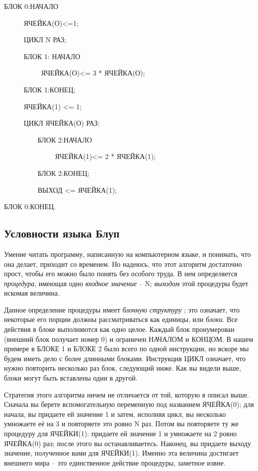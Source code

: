 \documentclass[../main.tex]{subfiles}
\begin{document}
БЛОК 0:НАЧАЛО

~~~~~ ЯЧЕЙКА(О)\textless=1;

~~~~~ ЦИКЛ N РАЗ;

~~~~~ БЛОК 1: НАЧАЛО

~~~~~~~~~~ ЯЧЕЙКА(О)\textless= 3 * ЯЧЕЙКА(О);

~~~~~ БЛОК 1:КОНЕЦ;

~~~~~ ЯЧЕЙКА(1) \textless= 1;

~~~~~ ЦИКЛ ЯЧЕЙКА(О) РАЗ:

~~~~~~~~~ БЛОК 2:НАЧАЛО

~~~~~~~~~~~~~~ ЯЧЕЙКА(1)\textless= 2 * ЯЧЕЙКА(1);

~~~~~~~~~ БЛОК 2:КОНЕЦ;

~~~~~~~~~ ВЫХОД \textless= ЯЧЕЙКА(1);

БЛОК 0:КОНЕЦ.


\subsection{Условности языка Блуп}

Умение читать программу, написанную на компьютерном языке, и понимать, что она делает, приходит со временем. Но надеюсь, что этот алгоритм достаточно прост, чтобы его можно было понять без особого труда. В нем определяется \emph{процедура}, имеющая одно \emph{входное значение} \--- N; \emph{выходом} этой процедуры будет искомая величина.

Данное определение процедуры имеет \emph{блочную структуру} ; это означает, что некоторые его порции должны рассматриваться как единицы, или \emph{блоки}. Все действия в блоке выполняются как одно целое. Каждый блок пронумерован (внешний блок получает номер 0) и ограничен НАЧАЛОМ и КОНЦОМ\@. В нашем примере в БЛОКЕ 1 и БЛОКЕ 2 было всего по одной инструкции, но вскоре мы будем иметь дело с более длинными блоками. Инструкция ЦИКЛ означает, что нужно повторить несколько раз блок, следующий ниже. Как вы видели выше, блоки могут быть вставлены один в другой.

Стратегия этого алгоритма ничем не отличается от той, которую я описал выше. Сначала вы берете вспомогательную переменную под названием ЯЧЕЙКА(0); для начала, вы придаете ей значение 1 и затем, исполняя цикл, вы несколько умножаете её на 3 и повторяете это ровно N раз. Потом вы повторяете ту же процедуру для ЯЧЕЙКИ(1): придаете ей значение 1 и умножаете на 2 ровно ЯЧЕЙКА(0) раз; после этого вы останавливаетесь. Наконец, вы придаете выходу значение, полученное вами для ЯЧЕЙКИ(1). Именно эта величина достигает внешнего мира \--- это единственное действие процедуры, заметное извне.
\end{document}
